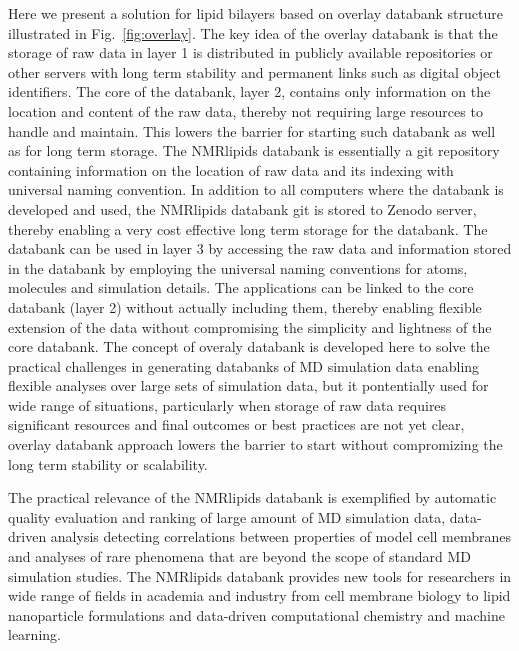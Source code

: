 \documentclass[fleqn,10pt]{wlscirep}
\begin{document}
Here we present a solution for lipid bilayers based on overlay databank structure illustrated in Fig.~\ref{fig:overlay}. The key idea of the overlay databank is that the storage of raw data in layer 1 is distributed in publicly available repositories or other servers with long term stability and permanent links such as digital object identifiers. The core of the databank, layer 2, contains only information on the location and content of the raw data, thereby not requiring large resources to handle and maintain. This lowers the barrier for starting such databank as well as for long term storage. The NMRlipids databank is essentially a git repository containing information on the location of raw data and its indexing with universal naming convention. In addition to all computers where the databank is developed and used, the NMRlipids databank git is stored to Zenodo server, thereby enabling a very cost effective long term storage for the databank. The databank can be used in layer 3 by accessing the raw data and information stored in the databank by employing the universal naming conventions for atoms, molecules and simulation details. The applications can be linked to the core databank (layer 2) without actually including them, thereby enabling flexible extension of the data without compromising the simplicity and lightness of the core databank. The concept of overaly databank is developed here to solve the practical challenges in generating databanks of MD simulation data enabling flexible analyses over large sets of simulation data, but it pontentially used for wide range of situations, particularly when storage of raw data requires significant resources and final outcomes or best practices are not yet clear, overlay databank approach lowers the barrier to start without compromizing the long term stability or scalability.

The practical relevance of the NMRlipids databank is exemplified by automatic quality evaluation and ranking of large amount of MD simulation data, data-driven analysis detecting correlations between properties of model cell membranes and analyses of rare phenomena that are beyond the scope of standard MD simulation studies. The NMRlipids databank provides new tools for researchers in wide range of fields in academia and industry from cell membrane biology to lipid nanoparticle formulations and data-driven computational chemistry and machine learning. 

\end{document}
